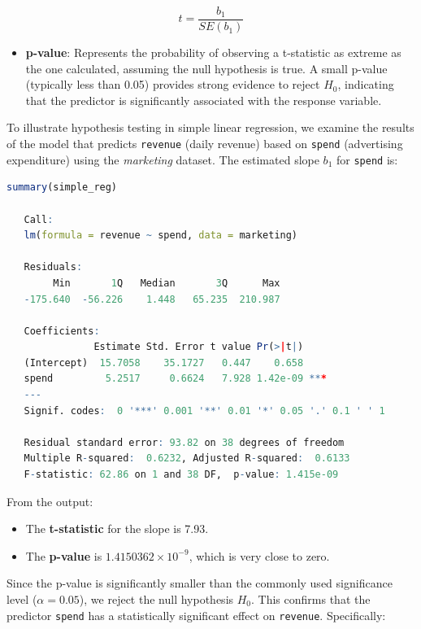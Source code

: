 \documentclass[
  11pt,
]{book}
\newcommand{\passthrough}[1]{#1}
\providecommand{\tightlist}{%
  \setlength{\itemsep}{0pt}\setlength{\parskip}{0pt}}
\theoremstyle{definition}
\theoremstyle{definition}
\theoremstyle{definition}
\theoremstyle{definition}
\theoremstyle{remark}
\begin{document}
\[
t = \frac{b_1}{SE(b_1)}
\]

\begin{itemize}
\tightlist
\item
  \textbf{p-value}: Represents the probability of observing a t-statistic as extreme as the one calculated, assuming the null hypothesis is true. A small p-value (typically less than 0.05) provides strong evidence to reject \(H_0\), indicating that the predictor is significantly associated with the response variable.
\end{itemize}

To illustrate hypothesis testing in simple linear regression, we examine the results of the model that predicts \passthrough{\lstinline!revenue!} (daily revenue) based on \passthrough{\lstinline!spend!} (advertising expenditure) using the \emph{marketing} dataset. The estimated slope \(b_1\) for \passthrough{\lstinline!spend!} is:

\begin{lstlisting}[language=R]
summary(simple_reg)
   
   Call:
   lm(formula = revenue ~ spend, data = marketing)
   
   Residuals:
        Min       1Q   Median       3Q      Max 
   -175.640  -56.226    1.448   65.235  210.987 
   
   Coefficients:
               Estimate Std. Error t value Pr(>|t|)    
   (Intercept)  15.7058    35.1727   0.447    0.658    
   spend         5.2517     0.6624   7.928 1.42e-09 ***
   ---
   Signif. codes:  0 '***' 0.001 '**' 0.01 '*' 0.05 '.' 0.1 ' ' 1
   
   Residual standard error: 93.82 on 38 degrees of freedom
   Multiple R-squared:  0.6232, Adjusted R-squared:  0.6133 
   F-statistic: 62.86 on 1 and 38 DF,  p-value: 1.415e-09
\end{lstlisting}

From the output:

\begin{itemize}
\tightlist
\item
  The \textbf{t-statistic} for the slope is 7.93.\\
\item
  The \textbf{p-value} is \ensuremath{1.4150362\times 10^{-9}}, which is very close to zero.
\end{itemize}

Since the p-value is significantly smaller than the commonly used significance level (\(\alpha = 0.05\)), we reject the null hypothesis \(H_0\). This confirms that the predictor \passthrough{\lstinline!spend!} has a statistically significant effect on \passthrough{\lstinline!revenue!}. Specifically:
\end{document}
